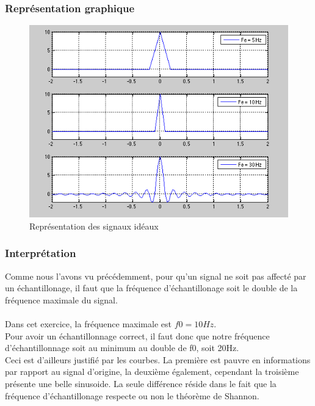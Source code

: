 \documentclass[a4paper, oneside]{report}
\begin{document}
	\subsubsection{Repr\'esentation graphique}

\begin{figure}[h]
   \centering
    \includegraphics[scale=0.80]{images/Exo2.png}
    \caption{Repr\'esentation des signaux id\'eaux}
  \end{figure}
 	\newpage{} 
  	\subsubsection{Interpr\'etation}
	
	Comme nous l'avons vu pr\'ec\'edemment, pour qu'un signal ne soit pas affecté par un \'echantillonage, il faut que la fr\'equence d'\'echantillonage soit le double de la fr\'equence maximale du signal.\\
	\\
	Dans cet exercice, la fr\'equence maximale est $f0=10Hz$.\\
	Pour avoir un \'echantillonnage correct, il faut donc que notre fr\'equence d'\'echantillonnage soit au minimum au double de f0, soit 20Hz.\\
	Ceci est d'ailleurs justifi\'e par les courbes. La premi\`ere est pauvre en informations par rapport au signal d'origine, la deuxi\`eme \'egalement, cependant la troisi\`eme pr\'esente une belle sinuso\¨ide. La seule diff\'erence r\'eside dans le fait que la fr\'equence d'\'echantillonage respecte ou non le th\'eor\`eme de Shannon.\\
\\
\end{document}
